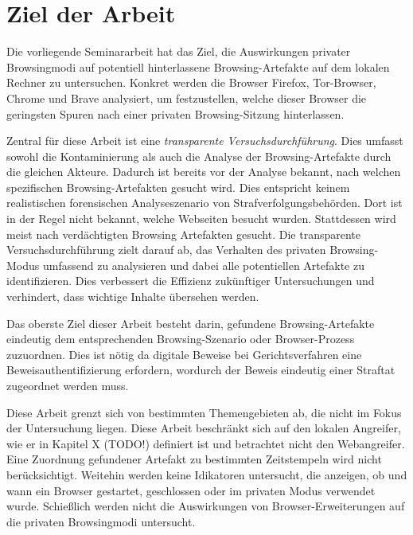 \chapter{Ziel der Arbeit}
Die vorliegende Seminararbeit hat das Ziel, die Auswirkungen privater Browsingmodi auf potentiell hinterlassene Browsing-Artefakte auf dem lokalen Rechner zu untersuchen. Konkret werden die Browser Firefox, Tor-Browser, Chrome und Brave analysiert, um festzustellen, welche dieser Browser die geringsten Spuren nach einer privaten Browsing-Sitzung hinterlassen.

Zentral für diese Arbeit ist eine \textit{transparente Versuchsdurchführung}. Dies umfasst sowohl die Kontaminierung als auch die Analyse der Browsing-Artefakte durch die gleichen Akteure. Dadurch ist bereits vor der Analyse bekannt, nach welchen spezifischen Browsing-Artefakten gesucht wird. Dies entspricht keinem realistischen forensischen Analyseszenario von Strafverfolgungsbehörden. Dort ist in der Regel nicht bekannt, welche Webseiten besucht wurden. Stattdessen wird meist nach verdächtigten Browsing Artefakten gesucht.
Die transparente Versuchsdurchführung zielt darauf ab, das Verhalten des privaten Browsing-Modus umfassend zu analysieren und dabei alle potentiellen Artefakte zu identifizieren. Dies verbessert die Effizienz zukünftiger Untersuchungen und verhindert, dass wichtige Inhalte übersehen werden. \cite{Horsman.2019}

Das oberste Ziel dieser Arbeit besteht darin, gefundene Browsing-Artefakte eindeutig dem entsprechenden Browsing-Szenario oder Browser-Prozess zuzuordnen. 
Dies ist nötig da digitale Beweise bei Gerichtsverfahren eine Beweisauthentifizierung erfordern, wordurch der Beweis eindeutig einer Straftat zugeordnet werden muss.

Diese Arbeit grenzt sich von bestimmten Themengebieten ab, die nicht im Fokus der Untersuchung liegen. Diese Arbeit beschränkt sich auf den lokalen Angreifer, wie er in Kapitel X (TODO!) definiert ist und betrachtet nicht den Webangreifer. Eine Zuordnung gefundener Artefakt zu bestimmten Zeitstempeln wird nicht berücksichtigt. 
Weitehin werden keine Idikatoren untersucht, die anzeigen, ob und wann ein Browser gestartet, geschlossen oder im privaten Modus verwendet wurde.
Schießlich werden nicht die Auswirkungen von Browser-Erweiterungen auf die privaten Browsingmodi untersucht.

